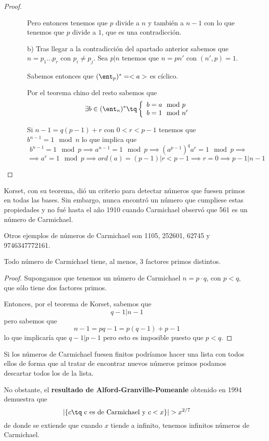 \begin{proof}
\begin{itemize}
\begin{itemize}
Pero entonces tenemos que $p$ divide a $n$ y también a $n-1$ con lo que tenemos que $p$ divide a $1$, que es una contradicción.

\item[b)]
Tras llegar a la contradicción del apartado anterior sabemos que $n=p_1...p_r$ con $p_i \neq p_j$. Sea $p | n$ tenemos que $n=pn'$ con $(n',p)=1$.

Sabemos entonces que $(\ent_p)^*=<a>$ es cíclico.

Por el teorema chino del resto sabemos que
\[\exists b \in (\ent_n)^* \tq \left\{\begin{array}{l}b=a\mod p \\ b=1 \mod n' \end{array}\right.\]

Si $n-1 = q(p-1)+r$ con $0 < r < p-1$ tenemos que $b^{n-1}=1 \mod n$ lo que implica que
\[b^{n-1}=1 \mod p \implies a^{n-1} = 1 \mod p \implies (a^{p-1})^qa^r = 1 \mod p \implies\]
\[\implies a^r = 1 \mod p \implies ord(a) = (p-1)|r<p-1 \implies r=0\implies p-1 | n-1\]
\end{itemize}
\end{itemize}
\end{proof}

Korset, con su teorema, dió un criterio para detectar números que fuesen primos en todas las bases. Sin embargo, nunca encontró un número que cumpliese estas propiedades y no fué hasta el año 1910 cuando Carmichael observó que 561 es un número de Carmichael.

Otros ejemplos de números de Carmichael son 1105, 252601, 62745 y 9746347772161.

\begin{prop}
Todo número de Carmichael tiene, al menos, 3 factores primos distintos.
\end{prop}
\begin{proof}
Supongamos que tenemos un número de Carmichael $n=p\cdot q$, con $p<q$, que sólo tiene dos factores primos.

Entonces, por el teorema de Korset, sabemos que
\[q-1 | n-1\]
pero sabemos que
\[n-1 =pq-1=p(q-1)+p-1\]
lo que implicaría que $q-1|p-1$ pero esto es imposible puesto que $p<q$.
\end{proof}

Si los números de Carmichael fuesen finitos podríamos hacer una lista con todos ellos de forma que al tratar de encontrar nuevos números primos podamos descartar todos los de la lista.

No obstante, el \textbf{resultado de Alford-Granville-Pomeanle} obtenido en 1994 demuestra que
\[|\{c \tq \text{ c es de Carmichael y } c < x\}| > x^{2/7}\]
de donde se extiende que cuando $x$ tiende a infinito, tenemos infinitos números de Carmichael.

